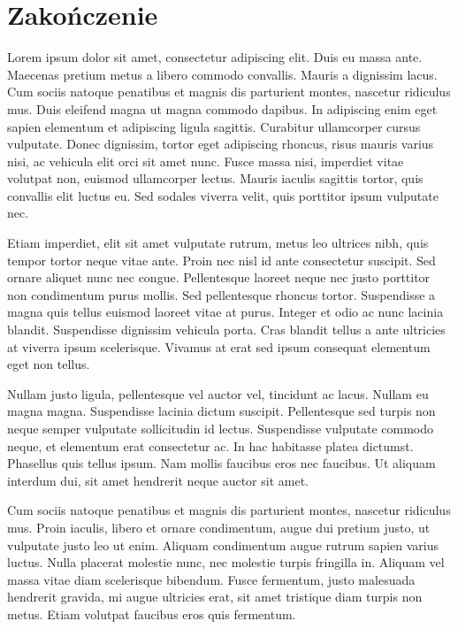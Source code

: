 \setcounter{secnumdepth}{-1}
\renewcommand{\chaptername}{}
\chapter{Zakończenie} 
Lorem ipsum dolor sit amet, consectetur adipiscing elit. Duis eu massa ante. Maecenas pretium metus a libero commodo convallis. Mauris a dignissim lacus. Cum sociis natoque penatibus et magnis dis parturient montes, nascetur ridiculus mus. Duis eleifend magna ut magna commodo dapibus. In adipiscing enim eget sapien elementum et adipiscing ligula sagittis. Curabitur ullamcorper cursus vulputate. Donec dignissim, tortor eget adipiscing rhoncus, risus mauris varius nisi, ac vehicula elit orci sit amet nunc. Fusce massa nisi, imperdiet vitae volutpat non, euismod ullamcorper lectus. Mauris iaculis sagittis tortor, quis convallis elit luctus eu. Sed sodales viverra velit, quis porttitor ipsum vulputate nec.

Etiam imperdiet, elit sit amet vulputate rutrum, metus leo ultrices nibh, quis tempor tortor neque vitae ante. Proin nec nisl id ante consectetur suscipit. Sed ornare aliquet nunc nec congue. Pellentesque laoreet neque nec justo porttitor non condimentum purus mollis. Sed pellentesque rhoncus tortor. Suspendisse a magna quis tellus euismod laoreet vitae at purus. Integer et odio ac nunc lacinia blandit. Suspendisse dignissim vehicula porta. Cras blandit tellus a ante ultricies at viverra ipsum scelerisque. Vivamus at erat sed ipsum consequat elementum eget non tellus.

Nullam justo ligula, pellentesque vel auctor vel, tincidunt ac lacus. Nullam eu magna magna. Suspendisse lacinia dictum suscipit. Pellentesque sed turpis non neque semper vulputate sollicitudin id lectus. Suspendisse vulputate commodo neque, et elementum erat consectetur ac. In hac habitasse platea dictumst. Phasellus quis tellus ipsum. Nam mollis faucibus eros nec faucibus. Ut aliquam interdum dui, sit amet hendrerit neque auctor sit amet.

Cum sociis natoque penatibus et magnis dis parturient montes, nascetur ridiculus mus. Proin iaculis, libero et ornare condimentum, augue dui pretium justo, ut vulputate justo leo ut enim. Aliquam condimentum augue rutrum sapien varius luctus. Nulla placerat molestie nunc, nec molestie turpis fringilla in. Aliquam vel massa vitae diam scelerisque bibendum. Fusce fermentum, justo malesuada hendrerit gravida, mi augue ultricies erat, sit amet tristique diam turpis non metus. Etiam volutpat faucibus eros quis fermentum.

